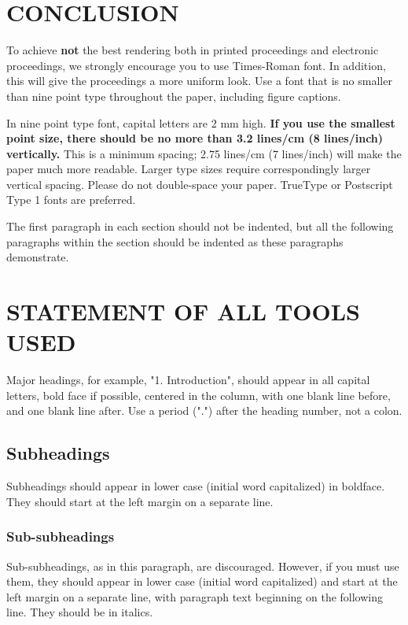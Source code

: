 \documentclass{article}
\begin{document}
\section{CONCLUSION}
\label{sec:conclusion}

To achieve {\bf not} the best rendering both in printed proceedings and electronic proceedings, we
strongly encourage you to use Times-Roman font.  In addition, this will give
the proceedings a more uniform look.  Use a font that is no smaller than nine
point type throughout the paper, including figure captions.

In nine point type font, capital letters are 2 mm high.  {\bf If you use the
smallest point size, there should be no more than 3.2 lines/cm (8 lines/inch)
vertically.}  This is a minimum spacing; 2.75 lines/cm (7 lines/inch) will make
the paper much more readable.  Larger type sizes require correspondingly larger
vertical spacing.  Please do not double-space your paper.  TrueType or
Postscript Type 1 fonts are preferred.

The first paragraph in each section should not be indented, but all the
following paragraphs within the section should be indented as these paragraphs
demonstrate.

\section{STATEMENT OF ALL TOOLS USED}
\label{sec:statementofalltoolsused}

Major headings, \cite{Lamp86} for example, "1. Introduction", should appear in all capital
letters, bold face if possible, centered in the column, with one blank line
before, and one blank line after. Use a period (".") after the heading number,
not a colon.

\subsection{Subheadings}
\label{ssec:subhead}

Subheadings should appear in lower case (initial word capitalized) in
boldface.  They should start at the left margin on a separate line.
 
\subsubsection{Sub-subheadings}
\label{sssec:subsubhead}

Sub-subheadings, as in this paragraph, are discouraged. However, if you
must use them, they should appear in lower case (initial word
capitalized) and start at the left margin on a separate line, with paragraph
text beginning on the following line.  They should be in italics.
\end{document}
